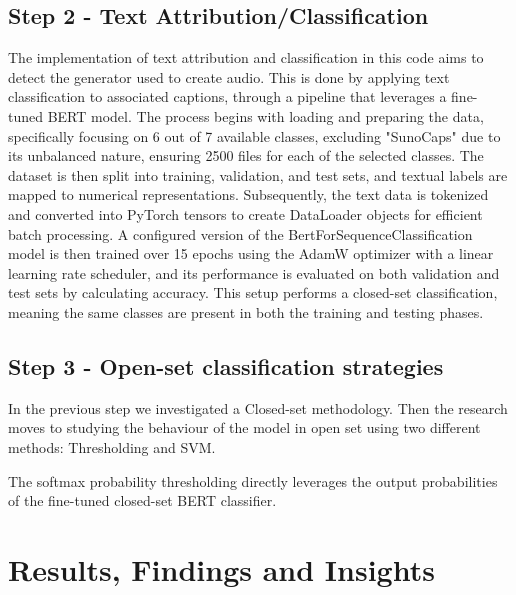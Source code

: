\documentclass[conference]{IEEEtran}  %
\begin{document}
\subsection{Step 2 - Text Attribution/Classification}
The implementation of text attribution and classification in this code aims to detect the generator used to create audio. This is done by applying text classification to associated captions, through a pipeline that leverages a fine-tuned BERT model. The process begins with loading and preparing the data, specifically focusing on 6 out of 7 available classes, excluding "SunoCaps" due to its unbalanced nature, ensuring 2500 files for each of the selected classes.
The dataset is then split into training, validation, and test sets, and textual labels are mapped to numerical representations. Subsequently, the text data is tokenized and converted into PyTorch tensors to create DataLoader objects for efficient batch processing. A configured version of the BertForSequenceClassification model is then trained over 15 epochs using the AdamW optimizer with a linear learning rate scheduler, and its performance is evaluated on both validation and test sets by calculating accuracy. This setup performs a closed-set classification, meaning the same classes are present in both the training and testing phases.\\

\subsection{Step 3 - Open-set classification strategies}
In the previous step we investigated a Closed-set methodology. 
Then the research moves to studying the behaviour of the model in open set using two different methods: Thresholding and SVM.

The softmax probability thresholding directly leverages the output probabilities of the fine-tuned closed-set BERT classifier.


\section{Results, Findings and Insights}
\end{document}
